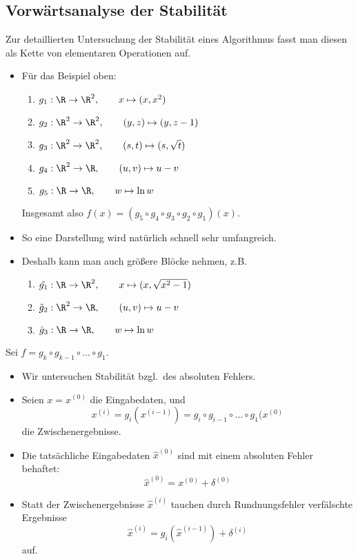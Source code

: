 \subsection{Vorwärtsanalyse der Stabilität}

Zur detaillierten Untersuchung der Stabilität eines Algorithmus
fasst man diesen als Kette von elementaren Operationen auf.


\begin{itemize}
  \item Für das Beispiel oben:
  \begin{enumerate}
  \item $g_1 : \R \to \R^2,  \qquad x \mapsto (x,x^2)$
  \item $g_2 : \R^2 \to \R^2, \qquad (y,z) \mapsto (y, z-1)$
  \item $g_3 : \R^2 \to \R^2, \qquad (s,t) \mapsto (s, \sqrt{t})$
  \item $g_4 : \R^2 \to \R, \qquad (u,v) \mapsto u-v$
  \item $g_5 : \R \to \R, \qquad w \mapsto \ln w$
  \end{enumerate}
Insgesamt also $f(x) = (g_5\circ g_4\circ g_3 \circ g_2 \circ g_1)(x)$.
  \item So eine Darstellung wird natürlich schnell sehr umfangreich.
  \item Deshalb kann man auch größere Blöcke nehmen, z.B.
\begin{enumerate}
  \item $\hat{g_1} : \R \to \R^2, \qquad x \mapsto (x,\sqrt{x^2-1})$
  \item $\hat{g}_2 : \R^2 \to \R, \qquad (u,v) \mapsto u-v$
  \item $\hat{g}_3 : \R \to \R, \qquad w \mapsto \ln w$
\end{enumerate}
\end{itemize}



Sei $f = g_k\circ g_{k-1}\circ \dots \circ g_1$.

\begin{itemize}
  \item Wir untersuchen Stabilität bzgl.\ des absoluten Fehlers.
  \item Seien $x = x^{(0)}$ die Eingabedaten, und \[ x^{(i)} = g_i(x^{(i-1)}) = g_i\circ g_{i-1}\circ \dots \circ g_1(x^{(0)}\] die Zwischenergebnisse.
  \item Die tatsächliche Eingabedaten $\hat{x}^{(0)}$ sind mit einem absoluten Fehler behaftet:
    \[
     \hat{x}^{(0)} = x^{(0)} + \delta^{(0)}
    \]
  \item Statt der Zwischenergebnisse $\hat{x}^{(i)}$ tauchen durch Rundnungsfehler verfälschte Ergebnisse
    \[
     \hat{x}^{(i)} = g_i(\hat{x}^{(i-1)}) + \delta^{(i)}
    \]
    auf.
\end{itemize}


